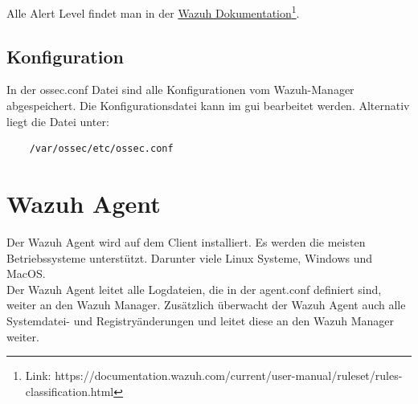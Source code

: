 Alle Alert Level findet man in der \href{https://documentation.wazuh.com/current/user-manual/ruleset/rules-classification.html}{Wazuh Dokumentation}\footnote{Link: https://documentation.wazuh.com/current/user-manual/ruleset/rules-classification.html}.


\subsection{Konfiguration}
In der ossec.conf Datei sind alle Konfigurationen vom Wazuh-Manager abgespeichert.
Die Konfigurationsdatei kann im \acrshort{gui} bearbeitet werden. Alternativ liegt die Datei unter:
\begin{lstlisting}
    /var/ossec/etc/ossec.conf
\end{lstlisting}


\section{Wazuh Agent}
Der Wazuh Agent wird auf dem Client installiert.
Es werden die meisten Betriebssysteme unterstützt. Darunter viele Linux Systeme, Windows und MacOS.\\

Der Wazuh Agent leitet alle Logdateien, die in der agent.conf definiert sind, weiter an den Wazuh Manager.
Zusätzlich überwacht der Wazuh Agent auch alle Systemdatei- und Registryänderungen und leitet diese an den Wazuh Manager weiter. 
